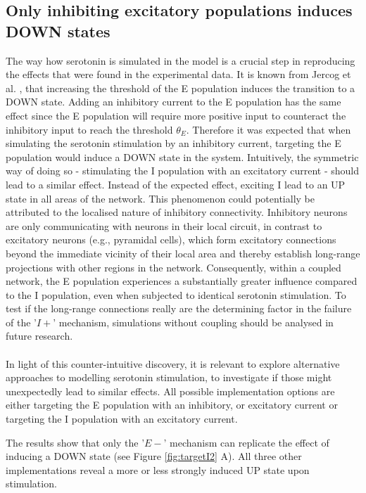 \subsection{Only inhibiting excitatory populations induces DOWN states\label{sec:sertargets}}
\noindent 
\indent The way how serotonin is simulated in the model is a crucial step in reproducing the effects that were found in the experimental data. It is known from Jercog et al. \cite{jercogUPDOWNCorticalDynamics2017}, that increasing the threshold of the E population induces the transition to a DOWN state. Adding an inhibitory current to the E population has the same effect since the E population will require more positive input to counteract the inhibitory input to reach the threshold $\theta_E$. Therefore it was expected that when simulating the serotonin stimulation by an inhibitory current, targeting the E population would induce a DOWN state in the system. Intuitively, the symmetric way of doing so - stimulating the I population with an excitatory current - should lead to a similar effect. Instead of the expected effect, exciting I lead to an UP state in all areas of the network. This phenomenon could potentially be attributed to the localised nature of inhibitory connectivity. Inhibitory neurons are only communicating with neurons in their local circuit, in contrast to excitatory neurons (e.g., pyramidal cells), which form excitatory connections beyond the immediate vicinity of their local area and thereby establish long-range projections with other regions in the network. Consequently, within a coupled network, the E population experiences a substantially greater influence compared to the I population, even when subjected to identical serotonin stimulation. To test if the long-range connections really are the determining factor in the failure of the '$I+$' mechanism, simulations without coupling should be analysed in future research.
\\
\\
\indent In light of this counter-intuitive discovery, it is relevant to explore alternative approaches to modelling serotonin stimulation, to investigate if those might unexpectedly lead to similar effects. All possible implementation options are either targeting the E population with an inhibitory, or excitatory current or targeting the I population with an excitatory current. 

\indent The results show that only the '$E-$' mechanism can replicate the effect of inducing a DOWN state (see Figure \ref{fig:targetI2} A). All three other implementations reveal a more or less strongly induced UP state upon stimulation. 

